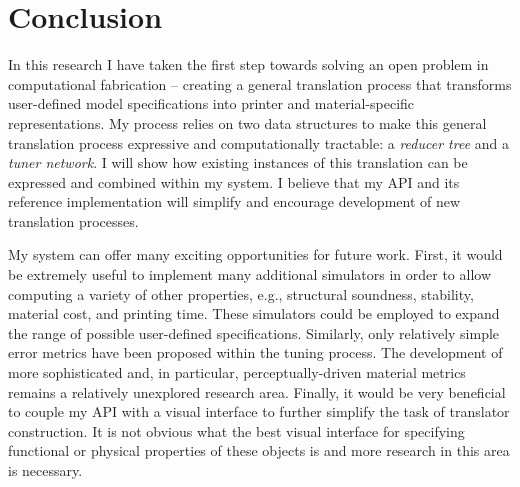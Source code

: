 \chapter{Conclusion}
In this research I have taken the first step towards solving an open problem in computational fabrication -- 
creating a general translation process that transforms user-defined model specifications into printer and material-specific representations.
My process relies on two data structures to make this general translation process expressive and computationally tractable: a \emph{reducer tree} and a \emph{tuner network}.
I will show how existing instances of this translation can be expressed and combined within my system.
I believe that my API and its reference implementation will simplify and encourage development of new translation processes.

My system can offer many exciting opportunities for future work.
First, it would be extremely useful to implement many additional simulators in order to allow computing a variety of other properties, e.g., structural soundness, stability, material cost, and printing time.
These simulators could be employed to expand the range of possible user-defined specifications.
Similarly, only relatively simple error metrics have been proposed within the tuning process.
The development of more sophisticated and, in particular, perceptually-driven material metrics remains a relatively unexplored research area.
Finally, it would be very beneficial to couple my API with a visual interface to further simplify the task of translator construction.
It is not obvious what the best visual interface for specifying functional or physical properties of these objects is and more research in this area is necessary.
